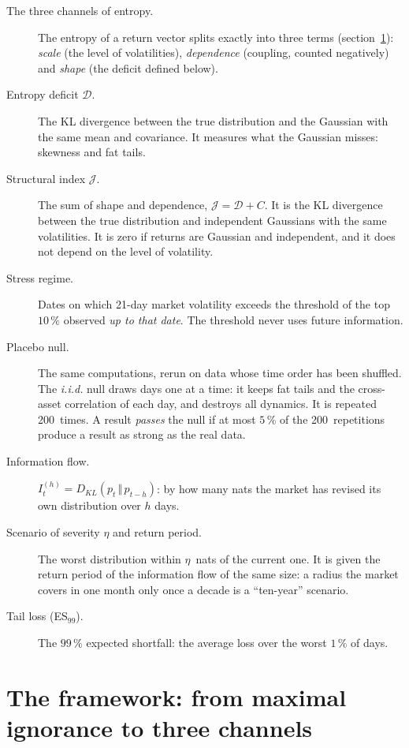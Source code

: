 \documentclass[11pt]{article}
\theoremstyle{definition}
\newcommand{\JJ}{\mathcal{J}}
\newcommand{\DD}{\mathcal{D}}
\newcommand{\KL}[2]{D_{KL}\!\left(#1\,\Vert\,#2\right)}
\begin{document}
\begin{description}
\item[The three channels of entropy.] The entropy of a return vector splits
exactly into three terms (section~\ref{sec:cadre}): \emph{scale} (the level of
volatilities), \emph{dependence} (coupling, counted negatively) and
\emph{shape} (the deficit defined below).

\item[Entropy deficit $\DD$.] The KL divergence between the true distribution
and the Gaussian with the same mean and covariance. It measures what the
Gaussian misses: skewness and fat tails.

\item[Structural index $\JJ$.] The sum of shape and dependence, $\JJ=\DD+C$.
It is the KL divergence between the true distribution and independent
Gaussians with the same volatilities. It is zero if returns are Gaussian and
independent, and it does not depend on the level of volatility.

\item[Stress regime.] Dates on which 21-day market volatility exceeds the
threshold of the top $10\,\%$ observed \emph{up to that date}. The threshold
never uses future information.

\item[Placebo null.] The same computations, rerun on data whose time order has
been shuffled. The \emph{i.i.d.} null draws days one at a time: it keeps fat
tails and the cross-asset correlation of each day, and destroys all dynamics.
It is repeated 200~times. A result \emph{passes} the null if at most $5\,\%$ of
the 200~repetitions produce a result as strong as the real data.

\item[Information flow.] $I^{(h)}_t=\KL{p_t}{p_{t-h}}$: by how many nats the
market has revised its own distribution over $h$ days.

\item[Scenario of severity $\eta$ and return period.] The worst distribution
within $\eta$~nats of the current one. It is given the return period of the
information flow of the same size: a radius the market covers in one month
only once a decade is a ``ten-year'' scenario.

\item[Tail loss (ES$_{99}$).] The $99\,\%$ expected shortfall: the average
loss over the worst $1\,\%$ of days.
\end{description}

\section{The framework: from maximal ignorance to three channels}
\label{sec:cadre}
\end{document}

